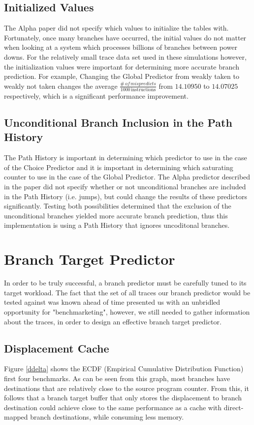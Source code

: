 \documentclass[twocolumn]{article}
\begin{document}
\subsection{Initialized Values}

The Alpha paper did not specify which values to initialize the tables with.
Fortunately, once many branches have occurred, the initial values do not matter
when looking at a system which processes billions of branches between power downs.
For the relatively small trace data set used in these simulations however,
the initialization values were important for determining more accurate branch prediction.
For example, Changing the Global Predictor from weakly taken to weakly not taken changes 
the average $\frac{\#\,of\,mispredicts}{1000\,\text{instructions}}$ from $14.10950$ to $14.07025$
respectively, which is a significant performance improvement.
 
\subsection{Unconditional Branch Inclusion in the Path History}

The Path History is important in determining which predictor to use
in the case of the Choice Predictor and it is important in determining
which saturating counter to use in the case of the Global Predictor.
The Alpha predictor described in the paper did not specify whether or not
unconditional branches are included in the Path History (i.e. jumps), but
could change the results of these predictors significantly. Testing both 
possibilities determined that the exclusion of the unconditional branches 
yielded more accurate branch prediction, thus this implementation is using
a Path History that ignores uncoditonal branches.

\section{Branch Target Predictor} 

In order to be truly successful, a branch predictor must be carefully
tuned to its target workload. The fact that the set of all traces our
branch predictor would be tested against was known ahead of time
presented us with an unbridled opportunity for "benchmarketing",
however, we still needed to gather information about the traces, in
order to design an effective branch target predictor. 

\subsection{Displacement Cache}
Figure \ref{ddelta} shows the ECDF (Empirical Cumulative 
Distribution Function) first four benchmarks. As can be 
seen from this graph, most branches have destinations that 
are relatively close to the source program counter. From 
this, it follows that a branch target buffer that only 
stores the displacement to branch destination could achieve 
close to the same performance as a cache with direct-mapped 
branch destinations, while consuming less memory. 
\end{document}
